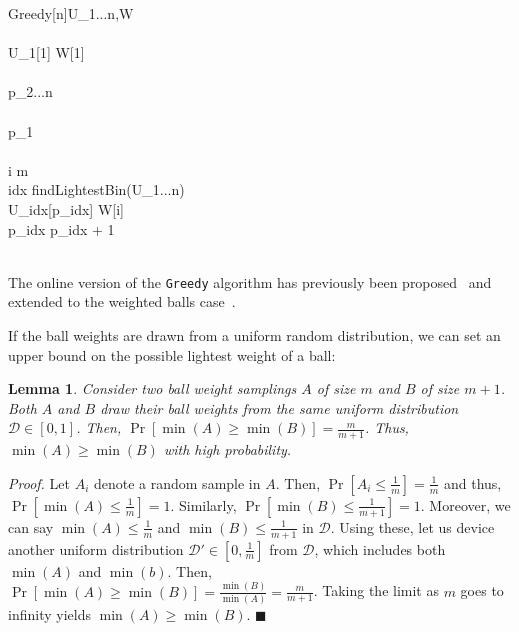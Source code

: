 \documentclass[12pt,psfig,a4]{article}
\newcommand{\gr}{\texttt{Greedy}}
\newtheorem{mylemma}{Lemma}
\theoremstyle{plain}
\begin{document}
\begin{pseudocode}[framebox]{Greedy[n]}{U_{1...n},W}
	 \\
   	 \\
	U_1[1] \GETS W[1] \\
	 \\
	p_{2...n}  \\
	 \\
	p_1  \\
	
	 \\
   	\FOR i  \TO m \DO
		\BEGIN 
			 \\
			idx \GETS findLightestBin(U_{1...n}) \\
			U_{idx}[p_{idx}] \GETS W[i] \\
			p_{idx} \GETS p_{idx} + 1 \\			
		\END \\
	\label{code:gr}
  \end{pseudocode}

The online version of the \gr{} algorithm has previously been proposed~\cite{azar1994balanced,azar1999balanced} and extended to the weighted balls case~\cite{talwar2007balanced}. 

 If the ball weights are drawn from a uniform random distribution, we can set an upper bound on the possible lightest weight of a ball:
 \begin{mylemma}
	Consider two ball weight samplings $A$ of size $m$ and $B$ of size $m+1$. Both $A$ and $B$ draw their ball weights from the same uniform distribution $\mathcal{D} \in [0,1]$.  Then, $\Pr[\min(A)\geq \min(B)]=\frac{m}{m+1}$. Thus, $\min(A)\geq \min(B)$ with high probability. 
	\label{lemma:wn1}
\end{mylemma}
\textit{Proof.} Let $A_i$ denote a random sample in $A$. Then, $\Pr[A_i\leq\frac{1}{m}]=\frac{1}{m}$ and thus, $\Pr[\min(A)\leq\frac{1}{m}]=1$. Similarly, $\Pr[\min(B)\leq\frac{1}{m+1}]=1$. Moreover, we can say $\min(A)\leq\frac{1}{m}$ and  $\min(B)\leq\frac{1}{m+1}$ in $\mathcal{D}$. Using these, let us device another uniform distribution $\mathcal{D'} \in [0,\frac{1}{m}]$ from $\mathcal{D}$, which includes both $\min(A)$ and $\min(b)$. Then, $ \Pr[\min(A)\geq \min(B)]=\frac{\min(B)}{\min(A)}=\frac{m}{m+1}$. Taking the limit as $m$ goes to infinity yields  $\min(A)\geq \min(B)$. $\blacksquare$ \\
\end{document}

